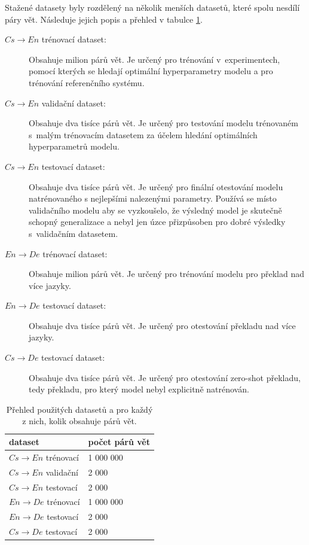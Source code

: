 Stažené datasety byly rozdělený na několik menších datasetů, které spolu nesdílí páry vět. Následuje jejich popis a přehled v tabulce \ref{table:datasets}.
\begin{description}
  \item[$Cs\rightarrow En$ trénovací dataset:] Obsahuje milion párů vět. Je určený pro trénování v~experimentech, pomocí kterých se hledají optimální hyperparametry modelu a pro trénování referenčního systému.
  \item[$Cs\rightarrow En$ validační dataset:] Obsahuje dva tisíce párů vět. Je určený pro testování modelu trénovaném s~malým trénovacím datasetem za účelem hledání optimálních hyperparametrů modelu.
  \item[$Cs\rightarrow En$ testovací dataset:] Obsahuje dva tisíce párů vět. Je určený pro finální otestování modelu natrénovaného s nejlepšími nalezenými parametry. Používá se místo validačního modelu aby se vyzkoušelo, že výsledný model je skutečně schopný generalizace a nebyl jen úzce přizpůsoben pro dobré výsledky s~validačním datasetem.
  \item[$En\rightarrow De$ trénovací dataset:] Obsahuje milion párů vět. Je určený pro trénování modelu pro překlad nad více jazyky.
  \item[$En\rightarrow De$ testovací dataset:] Obsahuje dva tisíce párů vět. Je určený pro otestování překladu nad více jazyky.
  \item[$Cs\rightarrow De$ testovací dataset:] Obsahuje dva tisíce párů vět. Je určený pro otestování zero-shot překladu, tedy překladu, pro který model nebyl explicitně natrénován.
\end{description}

\begin{table}[H]
    \begin{center}
        \begin{tabular}{ll}
          \toprule
          dataset & počet párů vět  \\
          \midrule
          $Cs\rightarrow En$ trénovací & 1 000 000 \\
          $Cs\rightarrow En$ validační & 2 000 \\
          $Cs\rightarrow En$ testovací & 2 000 \\
          $En\rightarrow De$ trénovací & 1 000 000 \\
          $En\rightarrow De$ testovací & 2 000 \\
          $Cs\rightarrow De$ testovací & 2 000 \\
          \bottomrule
        \end{tabular}
    \end{center}
	\caption{Přehled použitých datasetů a pro každý z nich, kolik obsahuje párů vět.}
	\label{table:datasets}
\end{table}

